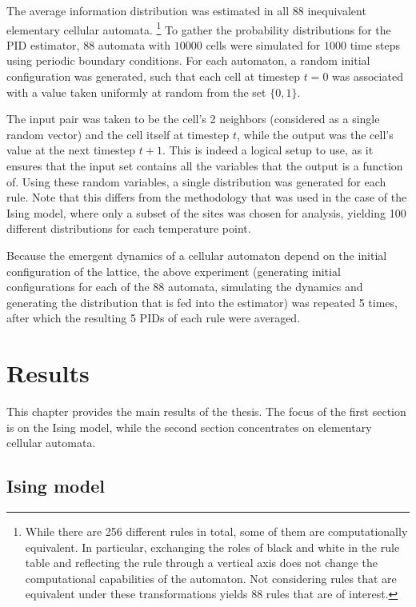 \documentclass[12pt]{article}
\begin{document}
The average information distribution was estimated in all 88 inequivalent elementary cellular automata. \footnote{While there are 256 different rules in total, some of them are computationally equivalent. In particular, exchanging the roles of black and white in the rule table and reflecting the rule through a vertical axis does not change the computational capabilities of the automaton. Not considering rules that are equivalent under these transformations yields 88 rules that are of interest.} To gather the probability distributions for the PID estimator, 88 automata with $10 000$ cells were simulated for $1000$ time steps using periodic boundary conditions. For each automaton, a random initial configuration was generated, such that each cell at timestep $t=0$ was associated with a value taken uniformly at random from the set $\{0,1\}$.

The input pair was taken to be the cell's 2 neighbors (considered as a single random vector) and the cell itself at timestep $t$, while the output was the cell's value at the next timestep $t+1$. This is indeed a logical setup to use, as it ensures that the input set contains all the variables that the output is a function of. Using these random variables, a single distribution was generated for each rule. Note that this differs from the methodology that was used in the case of the Ising model, where only a subset of the sites was chosen for analysis, yielding 100 different distributions for each temperature point. 

Because the emergent dynamics of a cellular automaton depend on the initial configuration of the lattice, the above experiment (generating initial configurations for each of the 88 automata, simulating the dynamics and generating the distribution that is fed into the estimator) was repeated 5 times, after which the resulting 5 PIDs of each rule were averaged.  

\newpage
\section{Results}

This chapter provides the main results of the thesis. The focus of the first section is on the Ising model, while the second section concentrates on elementary cellular automata. 

\subsection{Ising model}
\end{document}
